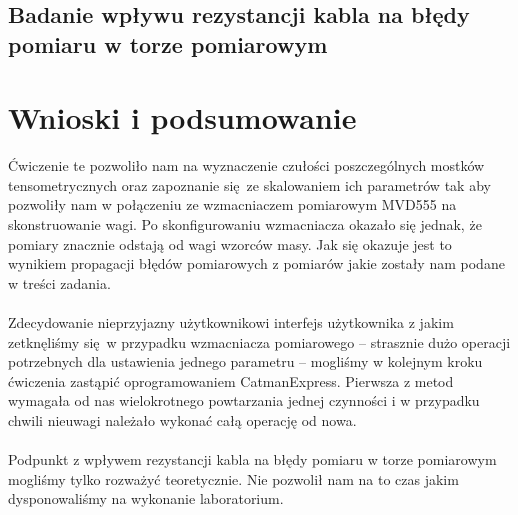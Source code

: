 \documentclass[a4paper, 12pt, titlepage]{article}
\begin{document}
		\subsection{Badanie wpływu rezystancji kabla na błędy pomiaru w torze pomiarowym}
	\section{Wnioski i podsumowanie}
		Ćwiczenie te pozwoliło nam na wyznaczenie czułości poszczególnych mostków tensometrycznych oraz zapoznanie się ze skalowaniem ich parametrów tak aby pozwoliły nam w połączeniu ze wzmacniaczem pomiarowym MVD555 na skonstruowanie wagi. Po skonfigurowaniu wzmacniacza okazało się jednak, że pomiary znacznie odstają od wagi wzorców masy. Jak się okazuje jest to wynikiem propagacji błędów pomiarowych z pomiarów jakie zostały nam podane w treści zadania.
		\\
		\\
		Zdecydowanie nieprzyjazny użytkownikowi interfejs użytkownika z jakim zetknęliśmy się w przypadku wzmacniacza pomiarowego -- strasznie dużo operacji potrzebnych dla ustawienia jednego parametru -- mogliśmy w kolejnym kroku ćwiczenia zastąpić oprogramowaniem Catman\textregistered Express. Pierwsza z metod wymagała od nas wielokrotnego powtarzania jednej czynności i w przypadku chwili nieuwagi należało wykonać całą operację od nowa. 
		\\
		\\
		Podpunkt z wpływem rezystancji kabla na błędy pomiaru w torze pomiarowym mogliśmy tylko rozważyć teoretycznie. Nie pozwolił nam na to czas jakim dysponowaliśmy na wykonanie laboratorium. %
\end{document}
